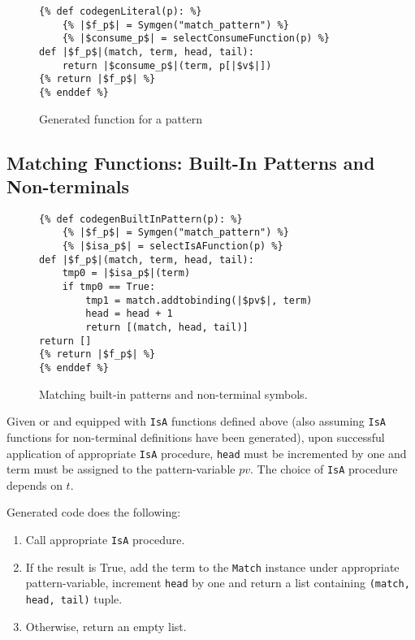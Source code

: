 \begin{figure}[ht]
\begin{verbatim}
{% def codegenLiteral(p): %}
	{% |$f_p$| = Symgen("match_pattern") %}
	{% |$consume_p$| = selectConsumeFunction(p) %}
def |$f_p$|(match, term, head, tail):
	return |$consume_p$|(term, p[|$v$|])
{% return |$f_p$| %}
{% enddef %}
\end{verbatim}
\caption{Generated function for a \LiteralPatternNoArg \space pattern}
\label{codegen-lit-code}
\end{figure}

\subsection{Matching Functions: Built-In Patterns and Non-terminals}

\begin{figure}[H]
\begin{verbatim}
{% def codegenBuiltInPattern(p): %}
	{% |$f_p$| = Symgen("match_pattern") %}
	{% |$isa_p$| = selectIsAFunction(p) %}
def |$f_p$|(match, term, head, tail):
	tmp0 = |$isa_p$|(term)
	if tmp0 == True:
		tmp1 = match.addtobinding(|$pv$|, term)
		head = head + 1
		return [(match, head, tail)]
return []
{% return |$f_p$| %}
{% enddef %}
\end{verbatim}
\caption{Matching built-in patterns and non-terminal symbols.}
\label{codegen-builtin-nt-1}
\end{figure}

Given \BuiltInPattern \space or \space \NonTerminal \space and equipped with \texttt{IsA} functions defined above (also assuming \texttt{IsA} functions for non-terminal definitions have been generated), upon successful application of appropriate \texttt{IsA} procedure, \texttt{head} must be incremented by one and term must be assigned to the pattern-variable $pv$. The choice of \texttt{IsA} procedure depends on $t$.

Generated code does the following:

\begin{enumerate}
\item Call appropriate \texttt{IsA} procedure.
\item If the result is True, add the term to the \texttt{Match} instance under appropriate pattern-variable, increment \texttt{head} by one and return a list containing \texttt{(match, head, tail)} tuple.
\item Otherwise, return an empty list.
\end{enumerate}


